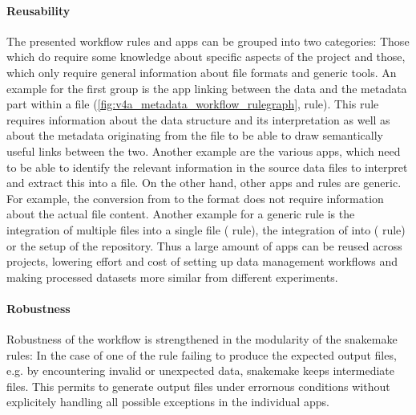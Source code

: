 \paragraph{Reusability}
The presented workflow rules and apps can be grouped into two categories: Those which do require some knowledge about specific aspects of the project and those, which only require general information about file formats and generic tools. An  example for the first group is the app linking between the data and the metadata part within a  file (\cref{fig:v4a_metadata_workflow_rulegraph},  rule). This rule requires information about the data structure and its interpretation as well as about the metadata originating from the  file to be able to draw semantically useful links between the two. Another example are the various  apps, which need to be able to identify the relevant information in the source data files to interpret and extract this into a  file.
On the other hand, other apps and rules are generic. For example, the conversion from  to the  format does not require information about the actual file content. Another example for a generic rule is the integration of multiple  files into a single file ( rule), the integration of  into  ( rule) or the setup of the  repository. Thus a large amount of apps can be reused across projects, lowering effort and cost of setting up data management workflows  and making processed datasets more similar from different experiments.

\paragraph{Robustness}
Robustness of the workflow is strengthened in the modularity of the snakemake rules: In the case of one of the rule failing to produce the expected output files, e.g. by encountering invalid or unexpected data, snakemake keeps intermediate files. This permits to generate output files under errornous conditions without explicitely handling all possible exceptions in the individual apps.

